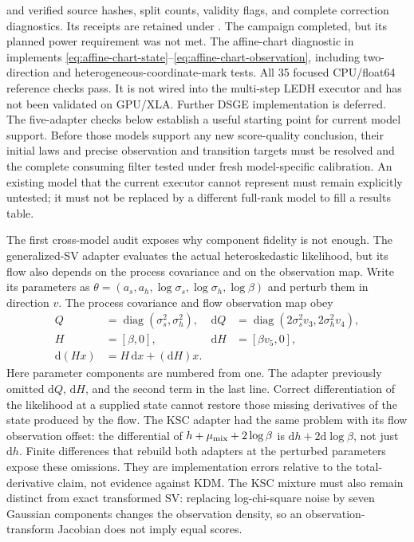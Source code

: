 \documentclass[11pt]{article}
\newcommand{\dd}{\mathrm{d}}
\begin{document}
and verified source hashes, split counts, validity flags, and complete
correction diagnostics.  Its receipts are retained under
.
The campaign completed, but its planned power requirement was not met.  The
affine-chart diagnostic in
implements \eqref{eq:affine-chart-state}--\eqref{eq:affine-chart-observation},
including two-direction and heterogeneous-coordinate-mark tests.  All 35
focused CPU/float64 reference checks pass.  It is not wired into the
multi-step LEDH executor and has not been validated on GPU/XLA.  Further DSGE
implementation is deferred. The five-adapter checks below establish a useful
starting point for current model support. Before those models support any
new score-quality conclusion, their initial laws and precise observation and
transition targets must be resolved and the complete consuming filter tested
under fresh model-specific calibration.  An existing model
that the current executor cannot represent must remain explicitly untested;
it must not be replaced by a different full-rank model to fill a results table.

The first cross-model audit exposes why component fidelity is not enough.
The generalized-SV adapter evaluates the actual heteroskedastic likelihood,
but its flow also depends on the process covariance and on the observation
map.  Write its parameters as
$\theta=(a_s,a_h,\log\sigma_s,\log\sigma_h,\log\beta)$ and perturb them in
direction $v$.  The process covariance and flow observation map obey
\begin{align}
 Q&=\operatorname{diag}(\sigma_s^2,\sigma_h^2),
 &\dd Q&=\operatorname{diag}(2\sigma_s^2v_3,2\sigma_h^2v_4),\\
 H&=[\beta,0], &\dd H&=[\beta v_5,0],\\
 \dd(Hx)&=H\,\dd x+(\dd H)x.
 \label{eq:repository-gsv-flow-tangent}
\end{align}
Here parameter components are numbered from one.  The adapter previously
omitted $\dd Q$, $\dd H$, and the second term in the last line.  Correct
differentiation of the likelihood at a supplied state cannot restore those
missing derivatives of the state produced by the flow.  The KSC adapter had
the same problem with its flow observation offset: the differential of
$h+\mu_{\rm mix}+2\log\beta$ is $\dd h+2\dd\log\beta$, not just $\dd h$.
Finite differences that rebuild both adapters at the perturbed parameters
expose these omissions.  They are implementation errors relative to the
total-derivative claim, not evidence against KDM.  The KSC mixture must also
remain distinct from exact transformed SV: replacing log-chi-square noise by
seven Gaussian components changes the observation density, so an
observation-transform Jacobian does not imply equal scores.
\end{document}
